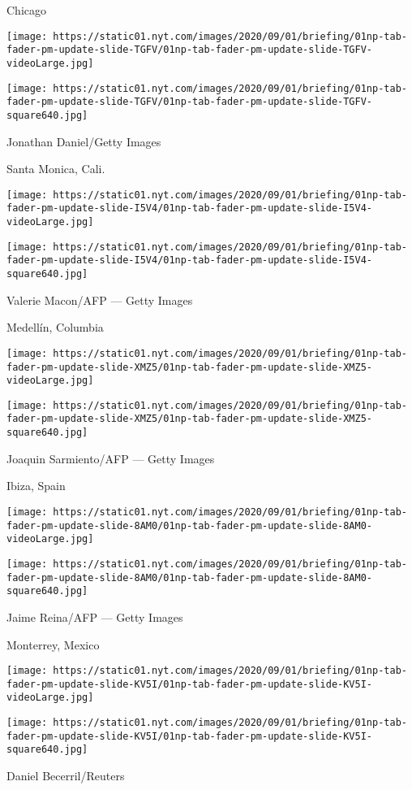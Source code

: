 Chicago

\texttt{[image: https://static01.nyt.com/images/2020/09/01/briefing/01np-tab-fader-pm-update-slide-TGFV/01np-tab-fader-pm-update-slide-TGFV-videoLarge.jpg]}

\texttt{[image: https://static01.nyt.com/images/2020/09/01/briefing/01np-tab-fader-pm-update-slide-TGFV/01np-tab-fader-pm-update-slide-TGFV-square640.jpg]}

 Jonathan Daniel/Getty Images

Santa Monica, Cali.

\texttt{[image: https://static01.nyt.com/images/2020/09/01/briefing/01np-tab-fader-pm-update-slide-I5V4/01np-tab-fader-pm-update-slide-I5V4-videoLarge.jpg]}

\texttt{[image: https://static01.nyt.com/images/2020/09/01/briefing/01np-tab-fader-pm-update-slide-I5V4/01np-tab-fader-pm-update-slide-I5V4-square640.jpg]}

 Valerie Macon/AFP --- Getty Images

Medellín, Columbia

\texttt{[image: https://static01.nyt.com/images/2020/09/01/briefing/01np-tab-fader-pm-update-slide-XMZ5/01np-tab-fader-pm-update-slide-XMZ5-videoLarge.jpg]}

\texttt{[image: https://static01.nyt.com/images/2020/09/01/briefing/01np-tab-fader-pm-update-slide-XMZ5/01np-tab-fader-pm-update-slide-XMZ5-square640.jpg]}

 Joaquin Sarmiento/AFP --- Getty Images

Ibiza, Spain

\texttt{[image: https://static01.nyt.com/images/2020/09/01/briefing/01np-tab-fader-pm-update-slide-8AM0/01np-tab-fader-pm-update-slide-8AM0-videoLarge.jpg]}

\texttt{[image: https://static01.nyt.com/images/2020/09/01/briefing/01np-tab-fader-pm-update-slide-8AM0/01np-tab-fader-pm-update-slide-8AM0-square640.jpg]}

 Jaime Reina/AFP --- Getty Images

Monterrey, Mexico

\texttt{[image: https://static01.nyt.com/images/2020/09/01/briefing/01np-tab-fader-pm-update-slide-KV5I/01np-tab-fader-pm-update-slide-KV5I-videoLarge.jpg]}

\texttt{[image: https://static01.nyt.com/images/2020/09/01/briefing/01np-tab-fader-pm-update-slide-KV5I/01np-tab-fader-pm-update-slide-KV5I-square640.jpg]}

 Daniel Becerril/Reuters

